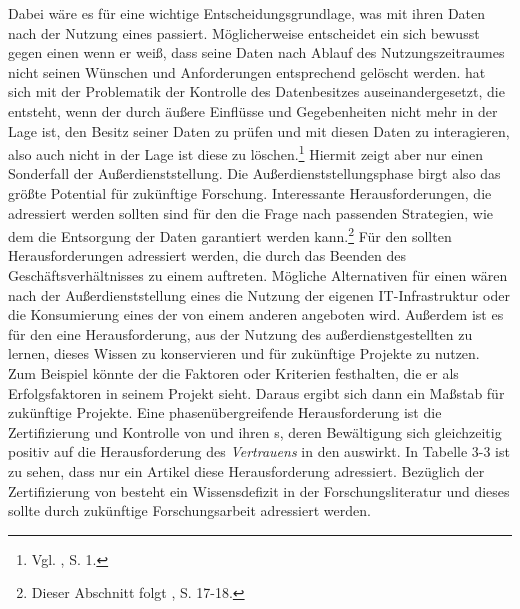 Dabei wäre es für \CSU eine wichtige Entscheidungsgrundlage, was mit ihren Daten nach der Nutzung eines \CSPs passiert. Möglicherweise entscheidet ein \CSU sich bewusst gegen einen \CSPComma wenn er weiß, dass seine Daten nach Ablauf des Nutzungszeitraumes nicht seinen Wünschen und Anforderungen entsprechend gelöscht werden.
\newline
\cite{Wang.2012b} hat sich mit der Problematik der Kontrolle des Datenbesitzes auseinandergesetzt, die entsteht, wenn der \CSU durch äußere Einflüsse und Gegebenheiten nicht mehr in der Lage ist, den Besitz seiner Daten zu prüfen und mit diesen Daten zu interagieren, also auch nicht in der Lage ist diese zu löschen.\footnote{Vgl. \cite{Wang.2012b}, S. 1.} 
Hiermit zeigt \cite{Wang.2012b} aber nur einen Sonderfall der Außerdienststellung.
\newline
Die Außerdienststellungsphase birgt also das größte Potential für zukünftige Forschung. 
Interessante Herausforderungen, die adressiert werden sollten sind für den \CSP die Frage nach passenden Strategien, wie dem \CSU die Entsorgung der Daten garantiert werden kann.\footnote{Dieser Abschnitt folgt \cite{Schneider.2013}, S. 17-18.}
Für den \CSU sollten Herausforderungen adressiert werden, die durch das Beenden des Geschäftsverhältnisses zu einem \CSP auftreten. 
Mögliche Alternativen für einen \CSU wären nach der Außerdienststellung eines \CSs die Nutzung der eigenen IT-Infrastruktur oder die Konsumierung eines  \CSs der von einem anderen \CSP angeboten wird.
Außerdem ist es für den \CSU eine Herausforderung, aus der Nutzung des außerdienstgestellten \CSs zu lernen, dieses Wissen zu konservieren und für zukünftige \CC Projekte zu nutzen.
Zum Beispiel könnte der \CSU die Faktoren oder Kriterien festhalten, die er als Erfolgsfaktoren in seinem \CC Projekt sieht. Daraus ergibt sich dann ein Maßstab für zukünftige \CC Projekte.
\newline
\newline
Eine phasenübergreifende Herausforderung ist die Zertifizierung und Kontrolle von \CSPn und ihren \Cs s, deren Bewältigung sich gleichzeitig positiv auf die Herausforderung des \emph{Vertrauens} in den \CSP auswirkt. 
In Tabelle 3-3 ist zu sehen, dass nur ein Artikel diese Herausforderung adressiert. 
Bezüglich der Zertifizierung von \CSs besteht ein Wissensdefizit in der Forschungsliteratur und dieses sollte durch zukünftige Forschungsarbeit adressiert werden.